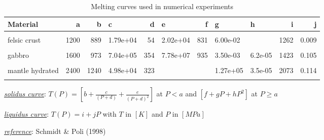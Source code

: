 \begin{landscape}\begin{table}

\caption{\label{tab:melts}Melting curves used in numerical experiments}
\centering
\begin{threeparttable}
\begin{tabular}[t]{lrrlrlrllrr}
\toprule
Material & a & b & c & d & e & f & g & h & i & j\\
\midrule
\cellcolor{gray!6}{sediments} & \cellcolor{gray!6}{1200} & \cellcolor{gray!6}{889} & \cellcolor{gray!6}{1.79e+04} & \cellcolor{gray!6}{54} & \cellcolor{gray!6}{2.02e+04} & \cellcolor{gray!6}{831} & \cellcolor{gray!6}{6.00e-02} & \cellcolor{gray!6}{} & \cellcolor{gray!6}{1262} & \cellcolor{gray!6}{0.009}\\
felsic crust & 1200 & 889 & 1.79e+04 & 54 & 2.02e+04 & 831 & 6.00e-02 &  & 1262 & 0.009\\
\cellcolor{gray!6}{basalt} & \cellcolor{gray!6}{1600} & \cellcolor{gray!6}{973} & \cellcolor{gray!6}{7.04e+05} & \cellcolor{gray!6}{354} & \cellcolor{gray!6}{7.78e+07} & \cellcolor{gray!6}{935} & \cellcolor{gray!6}{3.50e-03} & \cellcolor{gray!6}{6.2e-05} & \cellcolor{gray!6}{1423} & \cellcolor{gray!6}{0.105}\\
gabbro & 1600 & 973 & 7.04e+05 & 354 & 7.78e+07 & 935 & 3.50e-03 & 6.2e-05 & 1423 & 0.105\\
\cellcolor{gray!6}{mantle dry} & \cellcolor{gray!6}{} & \cellcolor{gray!6}{} & \cellcolor{gray!6}{} & \cellcolor{gray!6}{} & \cellcolor{gray!6}{} & \cellcolor{gray!6}{1394} & \cellcolor{gray!6}{1.33e-01} & \cellcolor{gray!6}{-5.1e-05} & \cellcolor{gray!6}{2073} & \cellcolor{gray!6}{0.114}\\
mantle hydrated & 2400 & 1240 & 4.98e+04 & 323 &  &  & 1.27e+05 & 3.5e-05 & 2073 & 0.114\\
\cellcolor{gray!6}{serpentine} & \cellcolor{gray!6}{2400} & \cellcolor{gray!6}{1240} & \cellcolor{gray!6}{4.98e+04} & \cellcolor{gray!6}{323} & \cellcolor{gray!6}{} & \cellcolor{gray!6}{} & \cellcolor{gray!6}{1.27e+05} & \cellcolor{gray!6}{3.5e-05} & \cellcolor{gray!6}{2073} & \cellcolor{gray!6}{0.114}\\
\bottomrule
\end{tabular}
\begin{tablenotes}
\item \uline{\textit{solidus curve}}: $T(P)=[b+\frac{c}{(P+d)}+\frac{e}{(P+d)^2}]$ at $P<a$ and $[f+gP+hP^2]$ at $P\geq a$
\item \uline{\textit{liquidus curve}}: $T(P) = i+jP$ with $T$ in $[K]$ and $P$ in $[MPa]$
\item \uline{\textit{reference}}: Schmidt \& Poli (1998)
\end{tablenotes}
\end{threeparttable}
\end{table}
\end{landscape}

